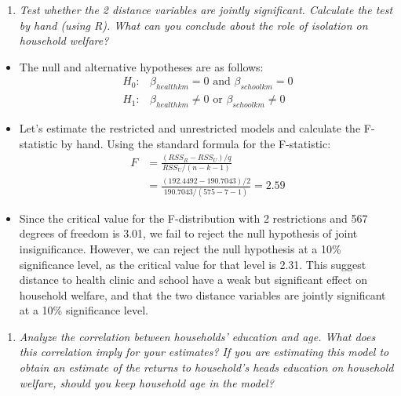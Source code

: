 \documentclass[
  letterpaper,
  DIV=11,
  numbers=noendperiod]{scrartcl}
\providecommand{\tightlist}{%
  \setlength{\itemsep}{0pt}\setlength{\parskip}{0pt}}
\begin{document}
\begin{enumerate}
\def\labelenumi{\arabic{enumi}.}
\setcounter{enumi}{2}
\tightlist
\item
  \emph{Test whether the 2 distance variables are jointly significant.
  Calculate the test by hand (using R). What can you conclude about the
  role of isolation on household welfare?}
\end{enumerate}

\begin{itemize}
\tightlist
\item
  The null and alternative hypotheses are as follows: \[
  \begin{aligned}
  H_0: & \beta_{healthkm} = 0 \text{ and } \beta_{schoolkm} = 0 \\
  H_1: & \beta_{healthkm} \neq 0 \text{ or } \beta_{schoolkm} \neq 0
  \end{aligned}
  \]
\end{itemize}

\begin{itemize}
\item
  Let's estimate the restricted and unrestricted models and calculate
  the F-statistic by hand. Using the standard formula for the
  F-statistic: \[
  \begin{aligned}
  F &= \frac{(RSS_R - RSS_U) / q}{RSS_U / (n - k - 1)}\\
  & = \frac{(192.4492-190.7043)/2}{190.7043/(575-7-1)} = 2.59
  \end{aligned}
  \]
\item
  Since the critical value for the F-distribution with 2 restrictions
  and 567 degrees of freedom is 3.01, we fail to reject the null
  hypothesis of joint insignificance. However, we can reject the null
  hypothesis at a 10\% significance level, as the critical value for
  that level is 2.31. This suggest distance to health clinic and school
  have a weak but significant effect on household welfare, and that the
  two distance variables are jointly significant at a 10\% significance
  level.
\end{itemize}

\begin{enumerate}
\def\labelenumi{\arabic{enumi}.}
\setcounter{enumi}{3}
\tightlist
\item
  \emph{Analyze the correlation between households' education and age.
  What does this correlation imply for your estimates? If you are
  estimating this model to obtain an estimate of the returns to
  household's heads education on household welfare, should you keep
  household age in the model?}
\end{enumerate}
\end{document}
